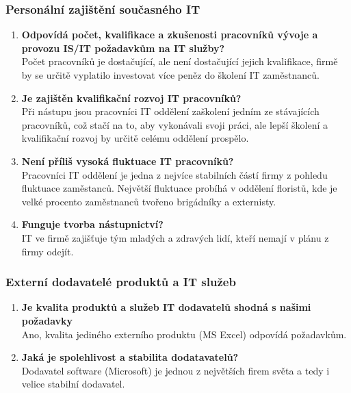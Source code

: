 \documentclass{article}
\begin{document}
\subsubsection*{Personální zajištění současného IT}
\begin{enumerate}
    \item \textbf{Odpovídá počet, kvalifikace a zkušenosti pracovníků vývoje a provozu IS/IT požadavkům na IT služby?} \\
        Počet pracovníků je dostačující, ale není dostačující jejich kvalifikace, firmě by se určitě vyplatilo investovat více peněz do školení IT zaměstnanců.

    \item \textbf{Je zajištěn kvalifikační rozvoj IT pracovníků?} \\
        Při nástupu jsou pracovníci IT oddělení zaškolení jedním ze stávajících pracovníků, což stačí na to, aby vykonávali svoji práci, ale lepší školení a kvalifikační rozvoj by určitě celému oddělení prospělo.

    \item \textbf{Není příliš vysoká fluktuace IT pracovníků?} \\
        Pracovníci IT oddělení je jedna z nejvíce stabilních částí firmy z pohledu fluktuace zaměstanců. Největší fluktuace probíhá v oddělení floristů, kde je velké procento zaměstnanců tvořeno brigádníky a externisty.

    \item \textbf{Funguje tvorba nástupnictví?} \\
        IT ve firmě zajišťuje tým mladých a zdravých lidí, kteří nemají v plánu z firmy odejít.
\end{enumerate}

\subsubsection*{Externí dodavatelé produktů a IT služeb}
\begin{enumerate}
    \item \textbf{Je kvalita produktů a služeb IT dodavatelů shodná s našimi požadavky} \\
        Ano, kvalita jediného externího produktu (MS Excel) odpovídá požadavkům.

    \item \textbf{Jaká je spolehlivost a stabilita dodatavatelů?} \\
        Dodavatel software (Microsoft) je jednou z největších firem světa a tedy i velice stabilní dodavatel.
\end{enumerate}
\end{document}

